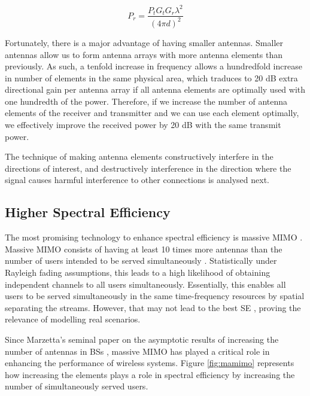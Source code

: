 \begin{equation} \label{eq:Friis2}
    P_r =\frac{P_t G_t G_r \lambda^2}{(4\pi d)^2}
\end{equation}

Fortunately, there is a major advantage of having smaller antennas. Smaller antennas allow us to form antenna arrays with more antenna elements than previously. As such, a tenfold increase in frequency allows a hundredfold increase in number of elements in the same physical area, which traduces to 20 dB extra directional gain per antenna array if all antenna elements are optimally used with one hundredth of the power. Therefore, if we increase the number of antenna elements of the receiver and transmitter and we can use each element optimally, we effectively improve the received power by 20 dB with the same transmit power. 

The technique of making antenna elements constructively interfere in the directions of interest, and destructively interference in the direction where the signal causes harmful interference to other connections is analysed next.


\subsection*{Higher Spectral Efficiency}

The most promising technology to enhance spectral efficiency is massive \ac{MIMO} \cite{8861014}. Massive \ac{MIMO} consists of having at least 10 times more antennas than the number of users intended to be served simultaneously \cite{7402270}. Statistically under Rayleigh fading assumptions, this leads to a high likelihood of obtaining independent channels to all users simultaneously. Essentially, this enables all users to be served simultaneously in the same time-frequency resources by spatial separating the streams. However, that may not lead to the best \ac{SE} \cite{7294693}, proving the relevance of modelling real scenarios. 

Since Marzetta's seminal paper on the asymptotic results of increasing the number of antennas in \acp{BS} \cite{5595728}, massive \ac{MIMO} has played a critical role in enhancing the performance of wireless systems. Figure \ref{fig:mamimo} represents how increasing the elements plays a role in spectral efficiency by increasing the number of simultaneously served users.


